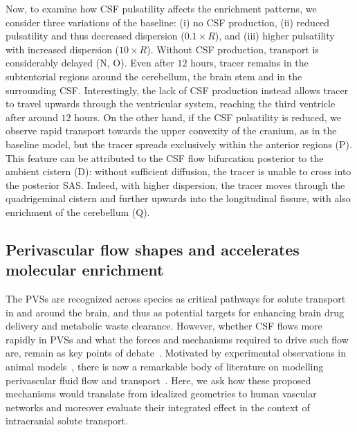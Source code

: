 \documentclass[fleqn,10pt]{wlscirep}
\newcommand{\mer}[1]{\textcolor{magenta}{#1}}
\begin{document}
Now, to examine how CSF pulsatility affects the enrichment patterns,
we consider three variations of the baseline: (i) no CSF production,
(ii) reduced pulsatility and thus decreased dispersion ($0.1 \times
R$), and (iii) higher pulsatility with increased dispersion ($10
\times R$). Without CSF production, transport is considerably delayed
(N, O). Even after $12$ hours, tracer remains in the
subtentorial regions around the cerebellum, the brain stem and in the
surrounding CSF. Interestingly, the lack of CSF production instead
allows tracer to travel upwards through the ventricular system,
reaching the third ventricle after around $12$ hours. On the other
hand, if the CSF pulsatility is reduced, we observe rapid transport
towards the upper convexity of the cranium, as in the baseline model,
but the tracer spreads exclusively within the anterior regions
(P). This feature can be attributed to the CSF flow
bifurcation posterior to the ambient cistern (D):
without sufficient diffusion, the tracer is unable to cross into the
posterior SAS. Indeed, with higher dispersion, the tracer moves
through the quadrigeminal cistern and further upwards into the
longitudinal fissure, with also enrichment of the cerebellum
(Q).

\subsection*{Perivascular flow shapes and accelerates molecular enrichment}
\label{sec:pvs_flow_results}

The PVSs are recognized across species as critical pathways for solute
transport in and around the brain\cite{}, and thus as potential
targets for enhancing brain drug delivery and metabolic waste
clearance\cite{}. However, whether CSF flows more rapidly in PVSs and
what the forces and mechanisms required to drive such flow are, remain
as key points of debate~\cite{bohr2022glymphatic,
  van2024caa}. Motivated by experimental observations in animal
models~\cite{iliff2012paravascular, iliff2013cerebral, mestre2018flow,
  bedussi2018paravascular}, there is now a remarkable body of
literature on modelling perivascular fluid flow and
transport~\cite{bilston2003arterial, asgari2016glymphatic,
  rey2018pulsatile, daversin2020mechanisms, sharp2019dispersion,
  thomas2019fluid, kedarasetti2020functional, kedarasetti2020arterial,
  troyetsky2021dispersion, martinac2021phase, gjerde2023directional,
  nozaleda2024arterial}. Here, we ask how these proposed mechanisms
would translate from idealized geometries to human vascular networks
and moreover evaluate their integrated effect in the context of
intracranial solute transport.
\end{document}
